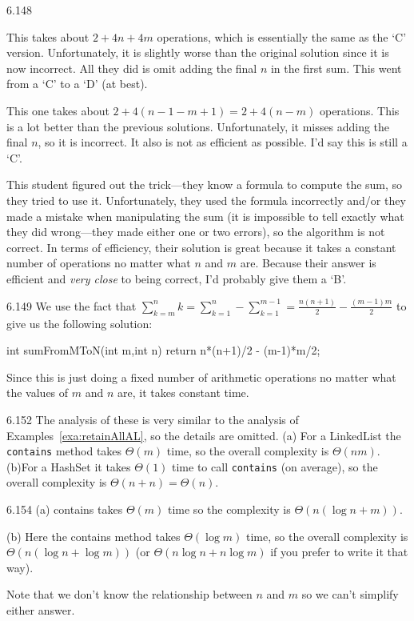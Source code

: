 \begin{Answer}{6.148}
\begin{solevalenum}
\item
This takes about $2+4n+4m$ operations, which is essentially the
same as the `C' version.  Unfortunately, it is slightly worse than the original
solution since it is now incorrect.  All they did is omit adding the final $n$ in the first
sum.  This went from a `C' to a `D' (at best).
\item
This one takes about $2+4(n-1-m+1)=2+4(n-m)$ operations.  This is a lot better than
the previous solutions.  Unfortunately, it misses adding the final $n$, so it is incorrect.
It also is not as efficient as possible.  I'd say this is still a `C'.
\item
This student figured out the trick---they know a formula to compute the sum,
so they tried to use it.
Unfortunately, they used the formula incorrectly and/or they made a mistake when
manipulating the sum (it is impossible to tell exactly what they did wrong---they
made either one or two errors), so the algorithm is not correct.
In terms of efficiency, their solution is great because it takes a constant
number of operations no matter what $n$ and $m$ are.
Because their answer is efficient and {\em very close} to being correct,
I'd probably give them a `B'.
\end{solevalenum}
\end{Answer}
\begin{Answer}{6.149}
We use the fact that
${\displaystyle \sum_{k=m}^n k = \sum_{k=1}^n - \sum_{k=1}^{m-1}
=\frac{n(n+1)}{2} - \frac{(m-1)m}{2} }$ to give us the following solution:
\begin{code}
    int sumFromMToN(int m,int n) {
	    return n*(n+1)/2 - (m-1)*m/2;
	}
\end{code}
Since this is just doing a fixed number of arithmetic operations no matter
what the values of $m$ and $n$ are, it takes constant time.
\end{Answer}
\begin{Answer}{6.152}
The analysis of these is very similar to the analysis of Examples~\ref{exa:retainAllAL}, so the details are omitted.
(a) For a LinkedList the \verb+contains+ method takes $\Theta(m)$ time, so the overall
complexity is $\Theta(nm)$.
(b)For a HashSet it takes $\Theta(1)$ time to call \verb+contains+ (on average), so
the overall complexity is $\Theta(n+n)=\Theta(n)$.
\end{Answer}
\begin{Answer}{6.154}
(a) contains takes $\Theta(m)$ time so the complexity is
$\Theta(n(\log n+m))$.

(b) Here the contains method takes $\Theta(\log m)$ time, so the overall
complexity is $\Theta(n(\log n+\log m))$
(or $\Theta(n\log n + n\log m)$
if you prefer to write it that way).

Note that we don't know the relationship between
$n$ and $m$ so we can't simplify either answer.
\end{Answer}
